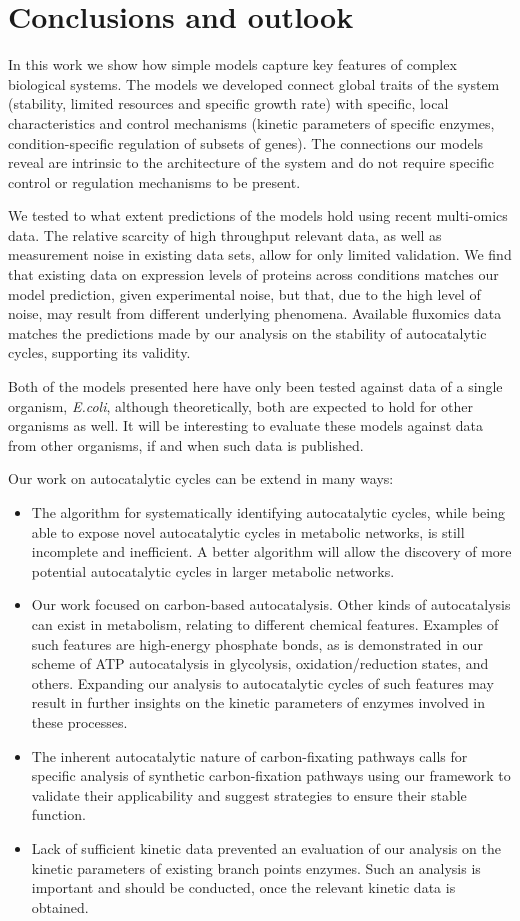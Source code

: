 \documentclass[a4page,notitlepage]{report}
\begin{document}
\chapter{Conclusions and outlook}
In this work we show how simple models capture key features of complex biological systems.
The models we developed connect global traits of the system (stability, limited resources and specific growth rate) with specific, local characteristics and control mechanisms (kinetic parameters of specific enzymes, condition-specific regulation of subsets of genes).
The connections our models reveal are intrinsic to the architecture of the system and do not require specific control or regulation mechanisms to be present.

We tested to what extent predictions of the models hold using recent multi-omics data.
The relative scarcity of high throughput relevant data, as well as measurement noise in existing data sets, allow for only limited validation.
We find that existing data on expression levels of proteins across conditions matches our model prediction, given experimental noise, but that, due to the high level of noise, may result from different underlying phenomena.
Available fluxomics data matches the predictions made by our analysis on the stability of autocatalytic cycles, supporting its validity.

Both of the models presented here have only been tested against data of a single organism, \emph{E.coli}, although theoretically, both are expected to hold for other organisms as well.
It will be interesting to evaluate these models against data from other organisms, if and when such data is published.

Our work on autocatalytic cycles can be extend in many ways:
\begin{itemize}
    \item The algorithm for systematically identifying autocatalytic cycles, while being able to expose novel autocatalytic cycles in metabolic networks, is still incomplete and inefficient.
A better algorithm will allow the discovery of more potential autocatalytic cycles in larger metabolic networks.
\item Our work focused on carbon-based autocatalysis.
    Other kinds of autocatalysis can exist in metabolism, relating to different chemical features.
    Examples of such features are high-energy phosphate bonds, as is demonstrated in our scheme of ATP autocatalysis in glycolysis, oxidation/reduction states, and others.
    Expanding our analysis to autocatalytic cycles of such features may result in further insights on the kinetic parameters of enzymes involved in these processes.
\item The inherent autocatalytic nature of carbon-fixating pathways calls for specific analysis of synthetic carbon-fixation pathways using our framework to validate their applicability and suggest strategies to ensure their stable function.
\item Lack of sufficient kinetic data prevented an evaluation of our analysis on the kinetic parameters of existing branch points enzymes.
    Such an analysis is important and should be conducted, once the relevant kinetic data is obtained.
\end{itemize}
\end{document}
